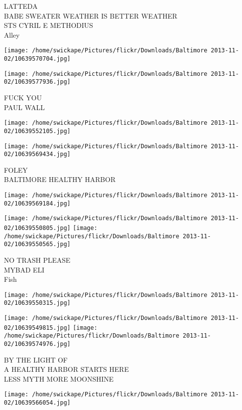 \documentclass[10pt,letterpaper]{article}
\begin{document}
LATTEDA\\
BABE SWEATER WEATHER IS BETTER WEATHER\\
STS CYRIL E METHODIUS\\
Alley
\pagebreak

\texttt{[image: /home/swickape/Pictures/flickr/Downloads/Baltimore 2013-11-02/10639570704.jpg]}

\vspace{0.25in}
\texttt{[image: /home/swickape/Pictures/flickr/Downloads/Baltimore 2013-11-02/10639577936.jpg]}

FUCK YOU\\
PAUL WALL
\pagebreak

\texttt{[image: /home/swickape/Pictures/flickr/Downloads/Baltimore 2013-11-02/10639552105.jpg]}

\vspace{0.25in}
\texttt{[image: /home/swickape/Pictures/flickr/Downloads/Baltimore 2013-11-02/10639569434.jpg]}

FOLEY\\
BALTIMORE HEALTHY HARBOR
\pagebreak

\texttt{[image: /home/swickape/Pictures/flickr/Downloads/Baltimore 2013-11-02/10639569184.jpg]}

\vspace{0.25in}
\texttt{[image: /home/swickape/Pictures/flickr/Downloads/Baltimore 2013-11-02/10639550805.jpg]}
\texttt{[image: /home/swickape/Pictures/flickr/Downloads/Baltimore 2013-11-02/10639550565.jpg]}

NO TRASH PLEASE\\
MYBAD ELI\\
Fish
\pagebreak

\texttt{[image: /home/swickape/Pictures/flickr/Downloads/Baltimore 2013-11-02/10639550315.jpg]}

\vspace{0.25in}
\texttt{[image: /home/swickape/Pictures/flickr/Downloads/Baltimore 2013-11-02/10639549815.jpg]}
\texttt{[image: /home/swickape/Pictures/flickr/Downloads/Baltimore 2013-11-02/10639574976.jpg]}

BY THE LIGHT OF\\
A HEALTHY HARBOR STARTS HERE\\
LESS MYTH MORE MOONSHINE
\pagebreak

\texttt{[image: /home/swickape/Pictures/flickr/Downloads/Baltimore 2013-11-02/10639566054.jpg]}
\end{document}
